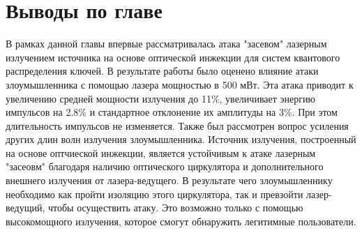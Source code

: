 \section{Выводы по главе}
В рамках данной главы впервые рассматривалась атака "засевом" лазерным излучением источника на основе оптической инжекции для систем квантового распределения ключей. В результате работы было оценено влияние атаки злоумышленника с помощью лазера мощностью в 500 мВт. 
Эта атака приводит к увеличению средней мощности излучения до 11\%, увеличивает энергию импульсов на 2.8\% и стандартное отклонение их амплитуды на 3\%. При этом длительность импульсов не изменяется.
Также был рассмотрен вопрос усиления других длин волн излучения злоумышленника. Источник излучения, построенный на основе оптчиеской инжекции, является устойчивым к атаке лазерным "засеовм" благодаря наличию оптического циркулятора и дополнительного внешнего излучения от лазера-ведущего.
В результате чего злоумышленнику необходимо как пройти изоляцию этого циркулятора, так и превзойти лазер-ведущий, чтобы осуществить атаку. Это возможно только с помощью высокомощного излучения, которое смогут обнаружить легитимные пользователи.